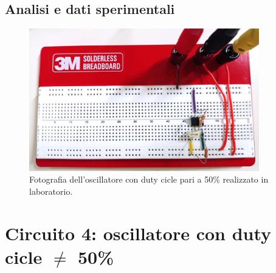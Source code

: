 \documentclass{report}
\begin{document}
\subsection{Analisi e dati sperimentali}
\begin{figure}[h]
	\centering
	\includegraphics[height=6.2cm]{immagini/circuito3}
	\caption{Fotografia dell'oscillatore con duty cicle pari a 50\% realizzato in laboratorio.}
	\label{figura:circuito3}
\end{figure}

\section{Circuito 4: oscillatore con duty cicle $\neq$ 50\%}
\end{document}
